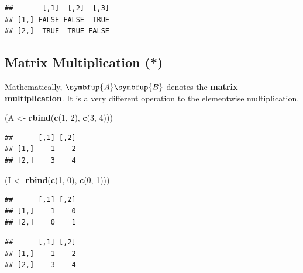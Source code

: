 \documentclass[10pt,b5paper,krantz1]{krantz}
\newenvironment{Shaded}{\begin{snugshade}}{\end{snugshade}}
\newcommand{\CommentTok}[1]{\textcolor[rgb]{0.37,0.37,0.37}{\textit{#1}}}
\newcommand{\DecValTok}[1]{\textcolor[rgb]{0.06,0.06,0.06}{#1}}
\newcommand{\KeywordTok}[1]{\textcolor[rgb]{0.27,0.27,0.27}{\textbf{#1}}}
\newcommand{\NormalTok}[1]{#1}
\newcommand{\OperatorTok}[1]{\textcolor[rgb]{0.43,0.43,0.43}{\textbf{#1}}}
\newcommand{\StringTok}[1]{\textcolor[rgb]{0.5,0.5,0.5}{#1}}
\renewcommand{\mathbf}[1]{\symbfup{#1}}
\begin{document}
\begin{verbatim}
##       [,1]  [,2]  [,3]
## [1,] FALSE FALSE  TRUE
## [2,]  TRUE  TRUE FALSE
\end{verbatim}

\hypertarget{matrix-multiplication}{%
\subsection{Matrix Multiplication (*)}\label{matrix-multiplication}}

Mathematically, \(\mathbf{A}\mathbf{B}\)
denotes the \textbf{matrix multiplication}. It is a very different operation
to the elementwise multiplication.

\begin{Shaded}
\begin{Highlighting}[]
\NormalTok{(A <-}\StringTok{ }\KeywordTok{rbind}\NormalTok{(}\KeywordTok{c}\NormalTok{(}\DecValTok{1}\NormalTok{, }\DecValTok{2}\NormalTok{), }\KeywordTok{c}\NormalTok{(}\DecValTok{3}\NormalTok{, }\DecValTok{4}\NormalTok{)))}
\end{Highlighting}
\end{Shaded}

\begin{verbatim}
##      [,1] [,2]
## [1,]    1    2
## [2,]    3    4
\end{verbatim}

\begin{Shaded}
\begin{Highlighting}[]
\NormalTok{(I <-}\StringTok{ }\KeywordTok{rbind}\NormalTok{(}\KeywordTok{c}\NormalTok{(}\DecValTok{1}\NormalTok{, }\DecValTok{0}\NormalTok{), }\KeywordTok{c}\NormalTok{(}\DecValTok{0}\NormalTok{, }\DecValTok{1}\NormalTok{)))}
\end{Highlighting}
\end{Shaded}

\begin{verbatim}
##      [,1] [,2]
## [1,]    1    0
## [2,]    0    1
\end{verbatim}

\begin{Shaded}
\end{Shaded}

\begin{verbatim}
##      [,1] [,2]
## [1,]    1    2
## [2,]    3    4
\end{verbatim}
\end{document}
